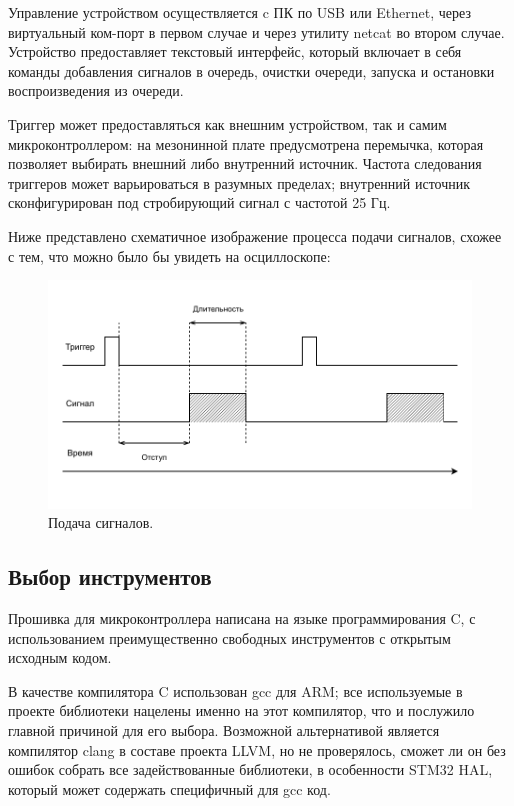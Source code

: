 \documentclass[rusmathsym, eqnumwithinsec, amspack, hyperref]{bomgost}
\begin{document}
Управление устройством осуществляется c ПК по USB или Ethernet, через виртуальный ком-порт в первом случае и через утилиту netcat во втором случае. Устройство предоставляет текстовый интерфейс, который включает в себя команды добавления сигналов в очередь, очистки очереди, запуска и остановки воспроизведения из очереди.

\pagebreak

Триггер может предоставляться как внешним устройством, так и самим микроконтроллером: на мезонинной плате предусмотрена перемычка, которая позволяет выбирать внешний либо внутренний источник. Частота следования триггеров может варьироваться в разумных пределах; внутренний источник сконфигурирован под стробирующий сигнал с частотой 25 Гц.

Ниже представлено схематичное изображение процесса подачи сигналов, схожее с тем, что можно было бы увидеть на осциллоскопе:

%
%
\begin{gostfigure}
\begin{figure}[H]
\centering
\includegraphics{data/timing_diagram.drawio.pdf}
\caption{Подача сигналов.}
\label{fig:timing_diagram}
\end{figure}
\end{gostfigure}

\subsection{Выбор инструментов}

Прошивка для микроконтроллера написана на языке программирования C, с использованием преимущественно свободных инструментов с открытым исходным кодом.

В качестве компилятора C использован gcc для ARM; все используемые в проекте библиотеки нацелены именно на этот компилятор, что и послужило главной причиной для его выбора. Возможной альтернативой является компилятор clang в составе проекта LLVM, но не проверялось, сможет ли он без ошибок собрать все задействованные библиотеки, в особенности STM32 HAL, который может содержать специфичный для gcc код.
\end{document}
